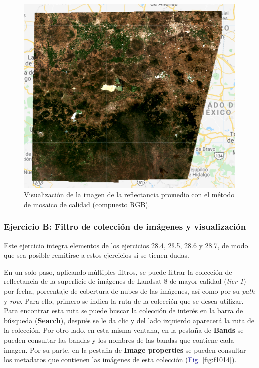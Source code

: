 \documentclass[
  12pt,
  letterpaper,
  twoside]{book}
\begin{document}
\begin{figure}[H]

{\centering \includegraphics[width=0.8\linewidth]{Img/imredmeanQM} 

}

\caption{Visualización de la imagen de la reflectancia promedio con el método de mosaico de calidad (compuesto RGB).}\label{fig:f1013}
\end{figure}

\hypertarget{ejercicio-b-filtro-de-colecciuxf3n-de-imuxe1genes-y-visualizaciuxf3n}{%
\subsubsection*{Ejercicio B: Filtro de colección de imágenes y visualización}\label{ejercicio-b-filtro-de-colecciuxf3n-de-imuxe1genes-y-visualizaciuxf3n}}

Este ejercicio integra elementos de los ejercicios 28.4, 28.5, 28.6 y 28.7, de modo que sea posible remitirse a estos ejercicios si se tienen dudas.

En un solo paso, aplicando múltiples filtros, se puede filtrar la colección de reflectancia de la superficie de imágenes de Landsat 8 de mayor calidad (\emph{tier 1}) por fecha, porcentaje de cobertura de nubes de las imágenes, así como por su \emph{path} y \emph{row}. Para ello, primero se indica la ruta de la colección que se desea utilizar. Para encontrar esta ruta se puede buscar la colección de interés en la barra de búsqueda (\textbf{Search}), después se le da clic y del lado izquierdo aparecerá la ruta de la colección. Por otro lado, en esta misma ventana, en la pestaña de \textbf{Bands} se pueden consultar las bandas y los nombres de las bandas que contiene cada imagen. Por su parte, en la pestaña de \textbf{Image properties} se pueden consultar los metadatos que contienen las imágenes de esta colección (\textcolor{darkblue}{Fig.} \ref{fig:f1014}).
\end{document}
